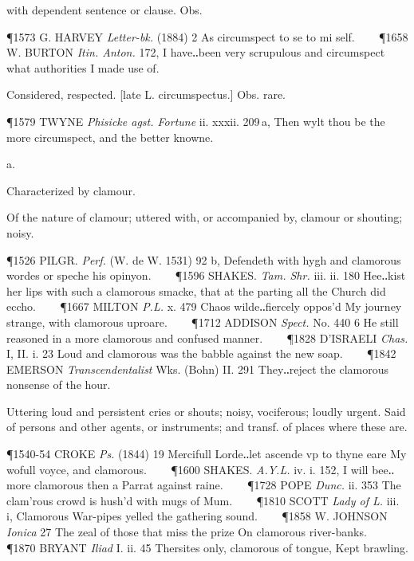 \begin{description}[wide, labelwidth=!, labelindent=0pt]
\begin{myenumerate}
 with dependent sentence or clause. Obs.

\P 1573 G. HARVEY  \textit{Letter-bk.} (1884) 2 As circumspect to se to mi self.    
\P 1658 W. BURTON  \textit{Itin. Anton.} 172, I have‥been very scrupulous and circumspect what authorities I made use of.

 Considered, respected. [late L. circumspectus.] Obs. rare.

\P 1579 TWYNE  \textit{Phisicke agst. Fortune} ii. xxxii. 209 a, Then wylt thou be the more circumspect, and the better knowne.
\end{myenumerate}


 a.

\noindent {}


\noindent Characterized by clamour.
\vspace{-0.3cm}

\begin{myenumerate}
 Of the nature of clamour; uttered with, or accompanied by, clamour or shouting; noisy.

\P 1526 PILGR.  \textit{Perf.} (W. de W. 1531) 92 b, Defendeth with hygh and clamorous wordes or speche his opinyon.    
\P 1596 SHAKES.  \textit{Tam. Shr.} iii. ii. 180 Hee‥kist her lips with such a clamorous smacke, that at the parting all the Church did eccho.    
\P 1667 MILTON  \textit{P.L.} x. 479 Chaos wilde‥fiercely oppos'd My journey strange, with clamorous uproare.    
\P 1712 ADDISON  \textit{Spect.} No. 440 6 He still reasoned in a more clamorous and confused manner.    
\P 1828 D'ISRAELI  \textit{Chas.} I, II. i. 23 Loud and clamorous was the babble against the new soap.    
\P 1842 EMERSON  \textit{Transcendentalist} Wks. (Bohn) II. 291 They‥reject the clamorous nonsense of the hour.

 Uttering loud and persistent cries or shouts; noisy, vociferous; loudly urgent. Said of persons and other agents, or instruments; and transf. of places where these are.

\P 1540-54 CROKE  \textit{Ps.} (1844) 19 Mercifull Lorde‥let ascende vp to thyne eare My wofull voyce, and clamorous.    
\P 1600 SHAKES.  \textit{A.Y.L.} iv. i. 152, I will bee‥more clamorous then a Parrat against raine.    
\P 1728 POPE  \textit{Dunc.} ii. 353 The clam'rous crowd is hush'd with mugs of Mum.    
\P 1810 SCOTT  \textit{Lady of L.} iii. i, Clamorous War-pipes yelled the gathering sound.    
\P 1858 W. JOHNSON  \textit{Ionica} 27 The zeal of those that miss the prize On clamorous river-banks.    
\P 1870 BRYANT  \textit{Iliad} I. ii. 45 Thersites only, clamorous of tongue, Kept brawling.


\end{myenumerate}
\end{description}
